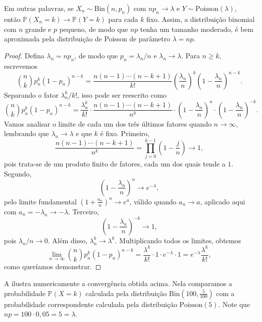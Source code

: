 \documentclass[12pt,portuguese]{article}
\let\ge\geqslant
\theoremstyle{definition}
\begin{document}
Em outras palavras, se $X_n\sim\mathrm{Bin}(n,p_n)$ com $np_n\to\lambda$ e
$Y\sim\mathrm{Poisson}(\lambda)$, então $\mathbb{P}(X_n=k)\to\mathbb{P}(Y=k)$ para
cada $k$ fixo. Assim, a distribuição binomial com $n$ grande e $p$ pequeno, de modo
que $np$ tenha um tamanho moderado, é bem aproximada pela distribuição de Poisson de
parâmetro $\lambda=np$.

\begin{proof}
Defina $\lambda_n = n p_n$, de modo que $p_n = \lambda_n/n$ e $\lambda_n\to\lambda$.
Para $n\ge k$, escrevemos
\[
  \binom{n}{k}p_n^k(1-p_n)^{n-k}
  = \frac{n(n-1)\cdots(n-k+1)}{k!}\left(\frac{\lambda_n}{n}\right)^k
    \left(1-\frac{\lambda_n}{n}\right)^{n-k}.
\]
Separando o fator $\lambda_n^k/k!$, isso pode ser reescrito como
\[
  \binom{n}{k}p_n^k(1-p_n)^{n-k}
  = \frac{\lambda_n^k}{k!}
    \cdot \frac{n(n-1)\cdots(n-k+1)}{n^k}
    \cdot \left(1-\frac{\lambda_n}{n}\right)^{n}
    \cdot \left(1-\frac{\lambda_n}{n}\right)^{-k}.
\]
Vamos analisar o limite de cada um dos três últimos fatores quando $n\to\infty$,
lembrando que $\lambda_n\to\lambda$ e que $k$ é fixo. Primeiro,
\[
  \frac{n(n-1)\cdots(n-k+1)}{n^k}
  = \prod_{j=0}^{k-1}\left(1-\frac{j}{n}\right) \longrightarrow 1,
\]
pois trata-se de um produto finito de fatores, cada um dos quais tende a $1$.
Segundo,
\[
  \left(1-\frac{\lambda_n}{n}\right)^{n} \longrightarrow e^{-\lambda},
\]
pelo limite fundamental $\left(1+\frac{a_n}{n}\right)^n\to e^{a}$, válido quando
$a_n\to a$, aplicado aqui com $a_n=-\lambda_n\to-\lambda$. Terceiro,
\[
  \left(1-\frac{\lambda_n}{n}\right)^{-k} \longrightarrow 1,
\]
pois $\lambda_n/n\to 0$. Além disso, $\lambda_n^k\to\lambda^k$. Multiplicando todos
os limites, obtemos
\[
  \lim_{n\to\infty}\binom{n}{k}p_n^k(1-p_n)^{n-k}
  = \frac{\lambda^k}{k!}\cdot 1\cdot e^{-\lambda}\cdot 1
  = e^{-\lambda}\frac{\lambda^k}{k!},
\]
como queríamos demonstrar.
\end{proof}

A  ilustra numericamente a convergência obtida acima. Nela comparamos
a probabilidade $\mathbb{P}(X=k)$ calculada pela distribuição $\mathrm{Bin}(100,\tfrac{5}{100})$
com a probabilidade correspondente calculada pela distribuição $\mathrm{Poisson}(5)$.
Note que $np = 100\cdot 0{,}05 = 5 = \lambda$.
\end{document}
